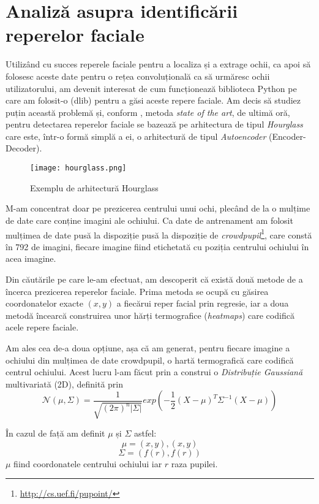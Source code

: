 \chapter{Analiză asupra identificării reperelor faciale}
\label{chapter6}
Utilizând cu succes reperele faciale pentru a localiza și a extrage ochii, ca apoi să folosesc aceste date pentru o rețea convoluțională ca să urmăresc ochii utilizatorului, am devenit interesat de cum funcționează biblioteca Python pe care am folosit-o (dlib) pentru a găsi aceste repere faciale.
Am decis să studiez puțin această problemă și, conform \cite{paper_stacked_hourglass}, metoda \emph{state of the art}, de ultimă oră, pentru detectarea reperelor faciale se bazează pe arhitectura de tipul \emph{Hourglass} care este, într-o formă simplă a ei, o arhitectură de tipul \emph{Autoencoder} (Encoder-Decoder).

\begin{figure}[h]
    \centering
    \texttt{[image: hourglass.png]}
    \caption{Exemplu de arhitectură Hourglass}
\end{figure}

M-am concentrat doar pe prezicerea centrului unui ochi, plecând de la o mulțime de date care conține imagini ale ochiului.
Ca date de antrenament am folosit mulțimea de date pusă la dispoziție pusă la dispoziție de \emph{crowdpupil}\footnote{\url{http://cs.uef.fi/pupoint/}}, care constă în 792 de imagini, fiecare imagine fiind etichetată cu poziția centrului ochiului în acea imagine.

Din căutările pe care le-am efectuat, am descoperit că există două metode de a încerca prezicerea reperelor faciale.
Prima metoda se ocupă cu găsirea coordonatelor exacte $(x, y)$ a fiecărui reper facial prin regresie, iar a doua metodă încearcă construirea unor hărți termografice (\emph{heatmaps}) care codifică acele repere faciale.

Am ales cea de-a doua opțiune, așa că am generat, pentru fiecare imagine a ochiului din mulțimea de date crowdpupil, o hartă termografică care codifică centrul ochiului.
Acest lucru l-am făcut prin a construi o \emph{Distribuție Gaussiană} multivariată (2D), definită prin
$$\mathcal{N}(\mu, \Sigma) = \frac{1}{\sqrt{(2\pi)^{n}|\Sigma|}}exp(-\frac{1}{2}(X-\mu)^T\Sigma^{-1}(X-\mu))$$

În cazul de față am definit $\mu$ și $\Sigma$ astfel:
$$\mu = (x, y), (x, y)$$
$$\Sigma = (f(r), f(r))$$
$\mu$ fiind coordonatele centrului ochiului iar $r$ raza pupilei.

